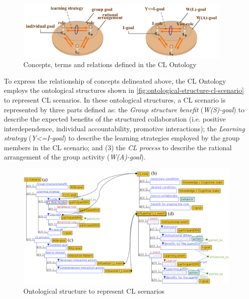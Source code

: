 \begin{figure}[!htb]
 \caption{Concepts, terms and relations defined in the CL Ontology}
 \label{fig:concepts-terms-and-relation-in-cl-ontology}
 \centering
 \includegraphics[width=0.95\textwidth]{images/chap-ontogacles1/concepts-terms-and-relation-in-cl-ontology.png}
\end{figure}

To express the relationship of concepts delineated above, the CL Ontology employs the ontological structures shown in \autoref{fig:ontological-structure-cl-scenario} to represent CL scenarios.
In these ontological structures, a CL scenario is represented by three parts defined as:
the \emph{Group structure benefit} (\emph{W(S)-goal}) to describe the expected benefits of the structured collaboration (i.e. positive interdependence, individual accountability, promotive interactions);
the \emph{Learning strategy} (\emph{Y<=I-goal}) to describe the learning strategies employed by the group members in the CL scenario; and
(3) the \emph{CL process} to describe the rational arrangement of the group activity (\emph{W(A)-goal}).

\begin{figure}[!htb]
 \caption{Ontological structure to represent CL scenarios}
 \label{fig:ontological-structure-cl-scenario}
 \centering
 \includegraphics[width=1\textwidth]{images/chap-ontogacles1/ontological-structure-cl-scenario.png}
\end{figure}

